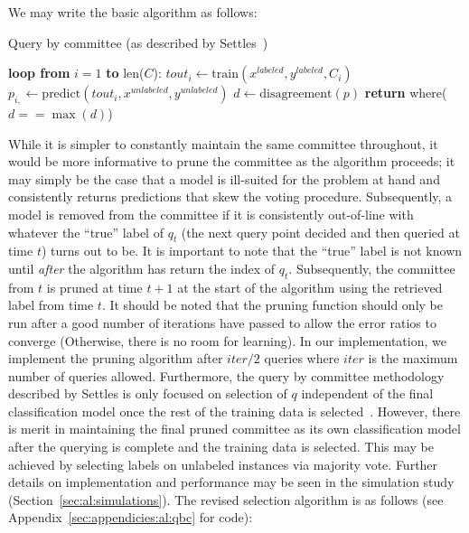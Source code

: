We may write the basic algorithm as follows:

\tablespacing
\begin{algorithm}[H]
	\caption{Query by committee (as described by 
	Settles~\cite{settles2010})}\label{euclid}
	\begin{algorithmic}[1]
		\State \textbf{loop from} $i=1$ \textbf{to} len($C$):
		\State \indent $\textit{tout}_{i} \gets 
		\text{train}(x^{labeled},y^{labeled},C_i)$
		\State \indent $p_{i,} \gets 
		\text{predict}(\textit{tout}_i,x^{unlabeled},y^{unlabeled})$
		\State $d \gets \text{disagreement}(p)$
		\State \textbf{return} where($d==\max{(d)}$)
		\EndProcedure
	\end{algorithmic}
\end{algorithm}
\bodyspacing

\noindent While it is simpler to constantly maintain the same committee 
throughout, it would be more informative to prune the committee as the 
algorithm proceeds; it may simply be the case that a model is ill-suited for 
the problem at hand and consistently returns predictions that skew the voting 
procedure. Subsequently, a model is removed from the committee if it is 
consistently out-of-line with whatever the ``true'' label of $q_t$ (the next 
query point decided and then queried at time $t$) turns out to be. It is 
important to note that the ``true'' label is not known until \textit{after} the 
algorithm has return the index of $q_t$. Subsequently, the committee from $t$ 
is pruned at time $t+1$ at the start of the algorithm using the retrieved 
label from time $t$. It should be noted that the pruning function should only 
be run after a good number of iterations have passed to allow the error ratios 
to converge (Otherwise, there is no room for learning). In our implementation, 
we implement the pruning algorithm after $iter/2$ queries where $iter$ is the 
maximum number of queries allowed.
Furthermore, the query by committee methodology described by Settles is only 
focused on selection of $q$ independent of the final classification model 
once the rest of the training data is selected~\cite{settles2010}. However, 
there is merit in maintaining the final pruned committee as its own 
classification model after the querying is complete and the training data is 
selected. This may be achieved by selecting labels on unlabeled instances via 
majority vote. Further details on implementation and performance may be seen in 
the simulation study (Section~\ref{sec:al:simulations}). The revised selection 
algorithm is as follows (see Appendix~\ref{sec:appendicies:al:qbc} for code):

